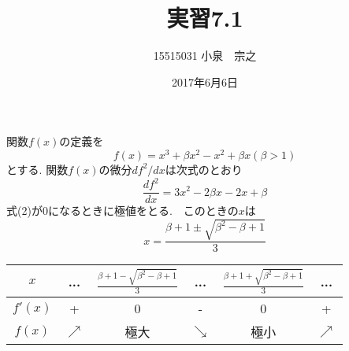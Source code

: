 \documentclass[12pt,a4j]{jarticle}
\title{実習7.1}
\author{15515031 小泉　宗之}
\date{2017年6月6日}
\begin{document}
\maketitle
関数$f(x)$の定義を
\begin{equation}
			f(x)=x^{3} + {\beta}x^{2} - x^{2} + {\beta}x　({\beta}>1)\label{eq:xyint}
\end{equation}
とする. 関数$f(x)$の微分$df^{2}/dx$は次式のとおり
\begin{equation}
			\frac{df^{2}}{dx} = 3x^2 -2{\beta}x - 2x + \beta \label{eq:xyrint}
\end{equation}
式(2)が0になるときに極値をとる.　このときの$x$は
\begin{equation}
			x = \frac{ {\beta} + 1 {\pm} \sqrt{ {\beta}^2 - {\beta}+1 } }  {3}\label{eq:xyrrint}
\end{equation}
\begin{table}[htb]
 \begin{tabular}{|c|c|c|c|c|c|} \hline

$x$ & ... & $\frac{ {\beta} + 1 - \sqrt{ {\beta}^2 - {\beta}+1 } }  {3} $ & ...&$\frac{ {\beta} + 1 + \sqrt{ {\beta}^2 - {\beta}+1 } }  {3}$ & ... \\ \hline
$f'(x)$ & + & 0 & - & 0 & + \\ \hline 
$f(x)$ & $\nearrow$ & 極大 & $\searrow$ & 極小 & $\nearrow$ \\ \hline
 \end{tabular}
\end{table}
\end{document}
